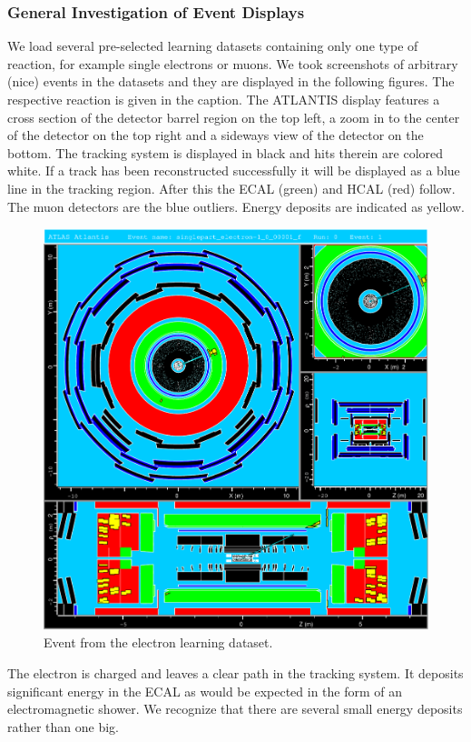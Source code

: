 \documentclass[11pt,a4paper,notitlepage]{scrartcl}
\begin{document}
\subsubsection{General Investigation of Event Displays}
We load several pre-selected learning datasets containing only one type of reaction, for example single electrons or muons. We took screenshots of arbitrary (nice) events in the datasets and they are displayed in the following figures. The respective reaction is given in the caption. The ATLANTIS display features a cross section of the detector barrel region on the top left, a zoom in to the center of the detector on the top right and a sideways view of the detector on the bottom. The tracking system is displayed in black and hits therein are colored white. If a track has been reconstructed successfully it will be displayed as a blue line in the tracking region. After this the ECAL (green) and HCAL (red) follow. The muon detectors are the blue outliers. Energy deposits are indicated as yellow.
\begin{figure}[H]
	\centering
	\includegraphics[width=.8\linewidth]{atlantis/electron_training}
	\caption{Event from the electron learning dataset.}
\end{figure} 
The electron is charged and leaves a clear path in the tracking system. It deposits significant energy in the ECAL as would be expected in the form of an electromagnetic shower. We recognize that there are several small energy deposits rather than one big.
\end{document}
